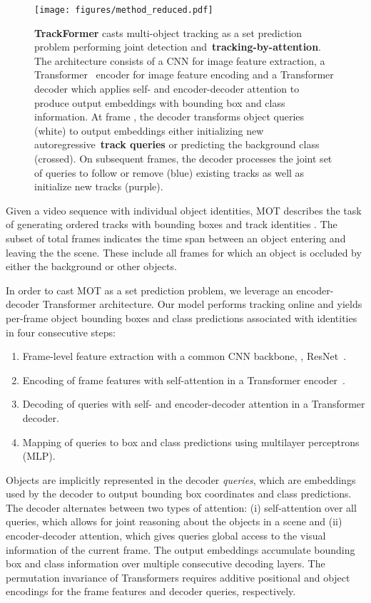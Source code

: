 \documentclass[10pt,twocolumn,letterpaper]{article}
\begin{document}
\begin{figure*}[ht]
    \centering
    \vspace{-10pt}
    \texttt{[image: figures/method\_reduced.pdf]}
    \caption{
        \textbf{TrackFormer} casts multi-object tracking as a set prediction problem performing joint detection and~\textbf{tracking-by-attention}.
The architecture consists of a CNN for image feature extraction, a Transformer~\cite{attention_is_all_you_need} encoder for image feature encoding and a Transformer decoder which applies self- and encoder-decoder attention to produce output embeddings with bounding box and class information.
At frame , the decoder transforms  object queries (white) to output embeddings either initializing new autoregressive~\textbf{track queries} or predicting the background class (crossed).
On subsequent frames, the decoder processes the joint set of  queries to follow or remove (blue) existing tracks as well as initialize new tracks (purple).
        }
    \label{fig:method}
\end{figure*} 
Given a video sequence with  individual object identities, MOT describes the task of generating ordered tracks \mbox{} with bounding boxes  and track identities .
The subset  of total frames  indicates the time span between an object entering and leaving the the scene.
These include all frames for which an object is occluded by either the background or other objects.

In order to cast MOT as a set prediction problem, we leverage an encoder-decoder Transformer architecture.
Our model performs tracking online and yields per-frame object bounding boxes and class predictions associated with identities in four consecutive steps:

\begin{enumerate}[label=(\roman*)]
    \item Frame-level feature extraction with a common CNN backbone, \eg, ResNet~\cite{he2016deep}.
    \item Encoding of frame features with self-attention in a Transformer encoder~\cite{attention_is_all_you_need}.
    \item Decoding of queries with self- and encoder-decoder attention in a Transformer decoder.
    \item Mapping of queries to box and class predictions using multilayer perceptrons (MLP). \label{item:detr_iv}
\end{enumerate}

Objects are implicitly represented in the decoder \textit{queries}, which are embeddings used by the decoder to output bounding box coordinates and class predictions.
The decoder alternates between two types of attention: (i) self-attention over all queries, which allows for joint reasoning about the objects in a scene and (ii) encoder-decoder attention, which gives queries global access to the visual information of the current frame.
The output embeddings accumulate bounding box and class information over multiple consecutive decoding layers.
The permutation invariance of Transformers requires additive positional and object encodings for the frame features and decoder queries, respectively.
\end{document}
